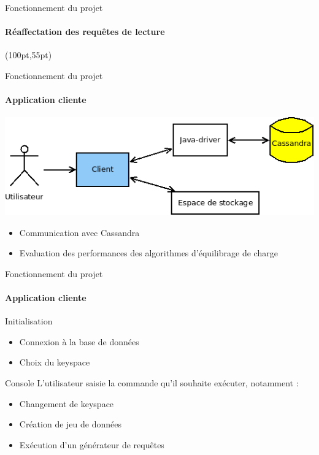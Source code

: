 \documentclass{beamer}
\begin{document}
\begin{frame}{Fonctionnement du projet}
\framesubtitle{Réaffectation des requêtes de lecture}
\begin{textblock*}{\paperwidth}(100pt,55pt)
\end{textblock*}
\end{frame}


\begin{frame}{Fonctionnement du projet}
 \framesubtitle{Application cliente}
 \centering
   \includegraphics[scale=0.40]{acteurs}
  
  \begin{itemize}
   \item Communication avec Cassandra
   \item Evaluation des performances des algorithmes d'équilibrage de charge
  \end{itemize}

\end{frame}

\begin{frame}{Fonctionnement du projet}
\framesubtitle{Application cliente}
  \begin{block}{Initialisation}
    \begin{itemize}
    \item Connexion à la base de données
    \item Choix du keyspace
    \end{itemize}
  \end{block}

  \begin{block}{Console}
  L'utilisateur saisie la commande qu'il souhaite exécuter, notamment :
    \begin{itemize}
    \item Changement de keyspace
    \item Création de jeu de données
    \item Exécution d'un générateur de requêtes
    \end{itemize}
  \end{block}
\end{frame}
\end{document}
